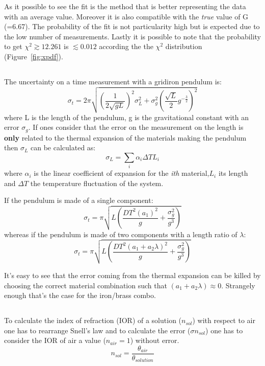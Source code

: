 \documentclass[twocolumn]{article}
\begin{document}
	As it possible to see the fit is the method that is better representing the data with an average value.
	Moreover it is also compatible with the \emph{true} value of G (=6.67).
	The probability of the fit is not particularity high but is expected due to the low number of measurements.
	Lastly it is possible to note that the probability to get $\chi ^2 \gtrsim 12.261 $ is $ \lesssim 0.012$ according the the $\chi ^2$ distribution (Figure~\ref{fig:xpdf}).
\subsection{} %
\label{sub:gridiron}
	The uncertainty on a time measurement with a gridiron pendulum is:
	\begin{equation}
		\sigma_t  = 2 \pi \sqrt{ (\frac{1}{2 \sqrt{g L }} ) ^{2} \sigma_L ^2 +
		\sigma_g ^2 (\frac{\sqrt{L}}{2} g^{-\frac{3}{2}})^2
		}
	\end{equation}
	where L is the length of the pendulum, g is the gravitational constant with an error $\sigma_g$.
	If ones consider that the error on the measurement on the length is \textbf{only} related to the thermal expansion of the materials making the pendulum then $\sigma_L$ can be calculated as:
	\begin{equation}
		\sigma_L = \sum_i \alpha_i  \Delta T  L_i
	\end{equation}
	where $\alpha_i$ is the linear coefficient of expansion for the \emph{ith} material,$L_i$ its length and $\Delta T $ the temperature fluctuation of the system.

	If the pendulum is made of a single component:
	\begin{equation}
	\sigma_t  = \pi \sqrt{L \left(\frac{DT^{2} \left(a_{1} \right)^{2}}{g} + \frac{\sigma_{g}^{2}}{g^{3}}\right)}
	\end{equation}
	whereas if the pendulum is made of two components with a length ratio of $\lambda$:
	\begin{equation}
	\sigma_t  = \pi \sqrt{L \left(\frac{DT^{2} \left(a_{1} + a_{2} \lambda \right)^{2}}{g} + \frac{\sigma_{g}^{2}}{g^{3}}\right)}
	\end{equation}

	It's easy to see that the error coming from the thermal expansion can be killed by choosing the correct material combination such that $ \left(a_{1} + a_{2} \lambda\right) \approx 0 $. Strangely enough that's the case for the iron/brass combo.
\subsection{} %
\label{sub:snell}
	To calculate the index of refraction (IOR) of a solution ($n_{sol}$) with respect to air one has to rearrange Snell's law and to calculate the error ($\sigma n_{sol}$) one has to consider the IOR of air a value ($n_{air} =1 $) without error.
	\begin{equation}
	n_{sol} = \frac{\theta_{air}}{\theta_{solution}} 
	\end{equation}
\end{document}
